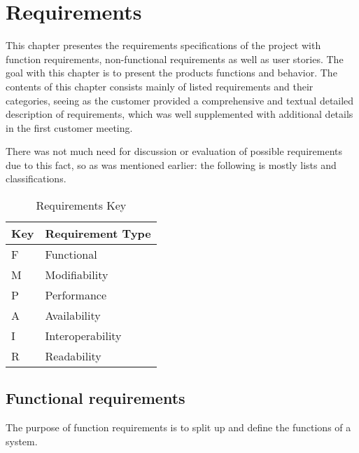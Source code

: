 \chapter{Requirements}
This chapter presentes the requirements specifications of the project with function requirements, non-functional requirements as well as user stories. The goal with this chapter is to present the products functions and behavior. The contents of this chapter consists mainly of listed requirements and their categories, seeing as the customer provided a comprehensive and textual detailed description of requirements,
which was well supplemented with additional details in the first customer meeting.

There was not much need for discussion or evaluation of possible requirements due to this fact, so as was mentioned earlier: the following is mostly lists and classifications.
\newpage

 \normalsize

\begin{table}[H]
\begin{center}
\begin{tabular}{|p{1.5cm}|p{6cm}|}
	\hline
	\textbf{Key} & \textbf{Requirement Type} \\
	\hline
	F & Functional\\
	\hline
	M & Modifiability\\
	\hline
	P & Performance\\
	\hline
	A & Availability\\
	\hline
	I & Interoperability\\
	\hline
	R & Readability\\
	
	\hline
\end{tabular}
\end{center}
\caption{Requirements Key}
\end{table}


\section{Functional requirements}
The purpose of function requirements is to split up and define the functions of a system. 

 \normalsize

